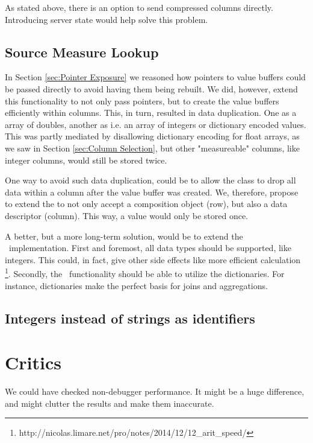 As stated above, there is an option to send compressed columns directly. Introducing server state would help solve this problem.

\subsection{Source Measure Lookup}
\label{sub:Source Measure Lookup}
In Section \ref{sec:Pointer Exposure} we reasoned how pointers to value buffers could be passed directly to avoid having them being rebuilt. We did, however, extend this functionality to not only pass pointers, but to create the value buffers efficiently within columns. This, in turn, resulted in data duplication. One as a array of doubles, another as i.e. an array of integers or dictionary encoded values. This was partly mediated by disallowing dictionary encoding for float arrays, as we saw in Section \ref{sec:Column Selection}, but other "measureable" columns, like integer columns, would still be stored twice.

One way to avoid such data duplication, could be to allow the  class to drop all data within a column after the value buffer was created. We, therefore, propose to extend the  to not only accept a composition object (row), but also a data descriptor (column). This way, a value would only be stored once.

A better, but a more long-term solution, would be to extend the \bd~implementation. First and foremost, all data types should be supported, like integers. This could, in fact, give other side effects like more efficient calculation \footnote{http://nicolas.limare.net/pro/notes/2014/12/12\_arit\_speed/}. Secondly, the \bd~functionality should be able to utilize the dictionaries. For instance, dictionaries make the perfect basis for joins and aggregations. 

\subsection{Integers instead of strings as identifiers}
\label{sub:Integers instead of strings as identifiers}


\section{Critics}
\label{sec:Critics}
We could have checked non-debugger performance. It might be a huge difference, and might clutter the results and make them inaccurate.

